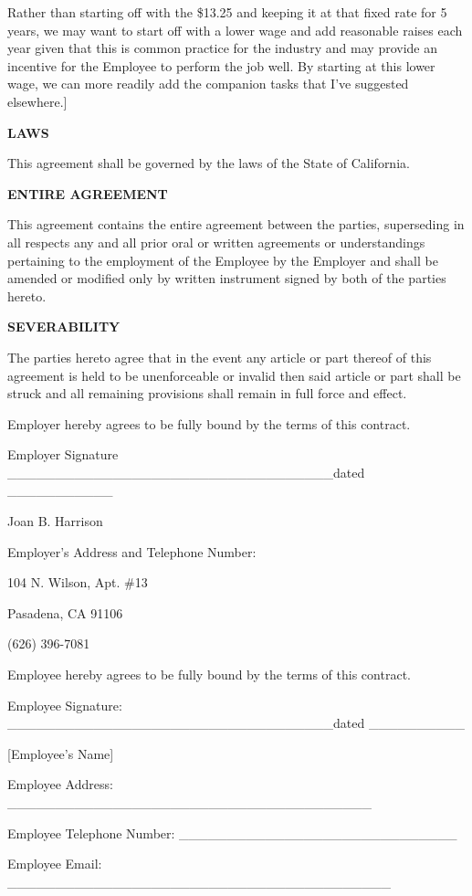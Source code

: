 \documentclass[]{article}
\newcommand{\mom}{Joan B. Harrison}
\begin{document}
Rather than starting off with the \$13.25 and keeping it at that fixed
rate for 5 years, we may want to start off with a lower wage and add
reasonable raises each year given that this is common practice for the
industry and may provide an incentive for the Employee to perform the
job well. By starting at this lower wage, we can more readily add the
companion tasks that I've suggested elsewhere.{]}

\textbf{LAWS}

This agreement shall be governed by the laws of the State of California.

\textbf{ENTIRE AGREEMENT}

This agreement contains the entire agreement between the parties,
superseding in all respects any and all prior oral or written agreements
or understandings pertaining to the employment of the Employee by the
Employer and shall be amended or modified only by written instrument
signed by both of the parties hereto.

\textbf{SEVERABILITY}

The parties hereto agree that in the event any article or part thereof
of this agreement is held to be unenforceable or invalid then said
article or part shall be struck and all remaining provisions shall
remain in full force and effect.

Employer hereby agrees to be fully bound by the terms of this contract.

Employer Signature
\_\_\_\_\_\_\_\_\_\_\_\_\_\_\_\_\_\_\_\_\_\_\_\_\_\_\_\_\_\_\_\_\_\_dated
\_\_\_\_\_\_\_\_\_\_\_

\mom{}

Employer's Address and Telephone Number:

104 N. Wilson, Apt. \#13

Pasadena, CA 91106

(626) 396-7081

Employee hereby agrees to be fully bound by the terms of this contract.

Employee Signature:
\_\_\_\_\_\_\_\_\_\_\_\_\_\_\_\_\_\_\_\_\_\_\_\_\_\_\_\_\_\_\_\_\_\_dated
\_\_\_\_\_\_\_\_\_\_

{[}Employee's Name{]}

Employee Address:
\_\_\_\_\_\_\_\_\_\_\_\_\_\_\_\_\_\_\_\_\_\_\_\_\_\_\_\_\_\_\_\_\_\_\_\_\_\_

Employee Telephone Number:
\_\_\_\_\_\_\_\_\_\_\_\_\_\_\_\_\_\_\_\_\_\_\_\_\_\_\_\_\_

Employee Email:
\_\_\_\_\_\_\_\_\_\_\_\_\_\_\_\_\_\_\_\_\_\_\_\_\_\_\_\_\_\_\_\_\_\_\_\_\_\_\_\_
\end{document}
